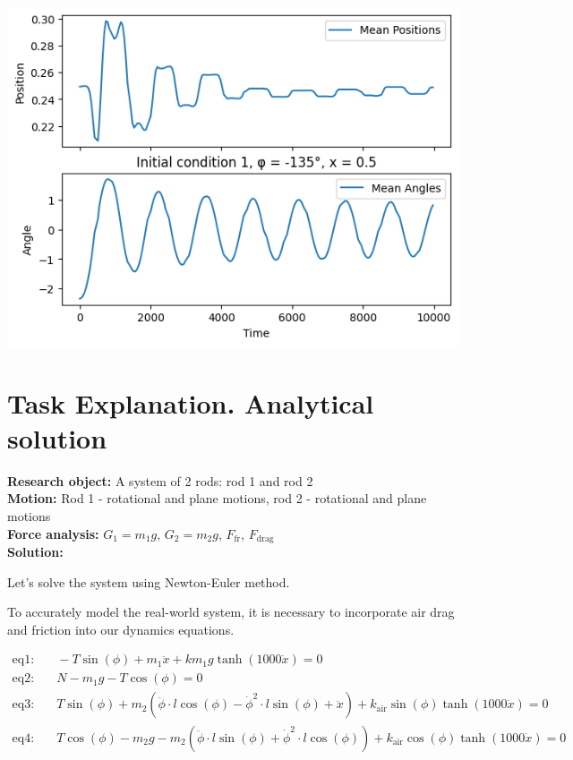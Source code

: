 \documentclass{article}
\begin{document}
\includegraphics*[scale=0.5]{graphics/init_3.png}


\section{Task Explanation. Analytical solution}

\textbf{Research object:} A system of 2 rods: rod 1 and rod 2\\
\textbf{Motion:} Rod 1 - rotational and plane motions, rod 2 - rotational and plane motions\\
\textbf{Force analysis:} $G_1 = m_1 g$, $G_2 = m_2 g$, $F_\text{fr}$, $F_\text{drag}$\\
\textbf{Solution:}

Let's solve the system using Newton-Euler method.

To accurately model the real-world system, it is necessary to incorporate air drag and friction into our dynamics equations.

\begin{align*}
  \text{eq1:} & \quad -T \sin(\phi) + m_1 \ddot{x} + k m_1 g \tanh(1000 \dot{x}) = 0 \\
  \text{eq2:} & \quad N - m_1 g - T \cos(\phi) = 0 \\
  \text{eq3:} & \quad T \sin(\phi) + m_2 \left(\ddot{\phi} \cdot l \cos(\phi) - \dot{\phi}^2 \cdot l \sin(\phi) + \ddot{x}\right) + k_{\text{air}} \sin(\phi) \tanh(1000 \dot{x}) = 0 \\
  \text{eq4:} & \quad T \cos(\phi) - m_2 g - m_2 \left(\ddot{\phi} \cdot l \sin(\phi) + \dot{\phi}^2 \cdot l \cos(\phi)\right) + k_{\text{air}} \cos(\phi) \tanh(1000 \dot{x}) = 0
\end{align*}
  
\end{document}
